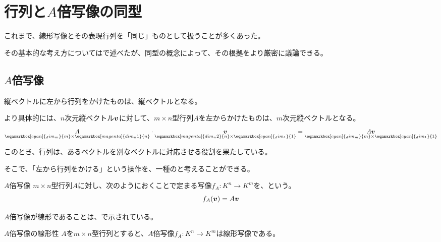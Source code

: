 \documentclass[../../../topic_linear-algebra]{subfiles}
\begin{document}
\sectionline
\section{行列と$A$倍写像の同型}\label{sec:matrix-A-map-isomorphism}

これまで、線形写像とその表現行列を「同じ」ものとして扱うことが多くあった。

その基本的な考え方についてはで述べたが、同型の概念によって、その根拠をより厳密に議論できる。

\subsection{$A$倍写像}

縦ベクトルに左から行列をかけたものは、縦ベクトルとなる。

より具体的には、$n$次元縦ベクトル$\vb*{v}$に対して、$m \times n$型行列$A$を左からかけたものは、$m$次元縦ベクトルとなる。
\begin{equation*}
  \underset{\eqnmarkbox[cyan]{_dim_m}{m} \times \eqnmarkbox[magenta]{dim_n1}{n}}{A} \cdot \underset{\eqnmarkbox[magenta]{dim_n2}{n} \times \eqnmarkbox[cyan]{_dim_1}{1}}{\vb*{v}} = \underset{\eqnmarkbox[cyan]{_dim_m}{m} \times \eqnmarkbox[cyan]{_dim_1}{1}}{A \vb*{v}}
\end{equation*}

このとき、行列は、あるベクトルを別なベクトルに対応させる役割を果たしている。

そこで、「左から行列をかける」という操作を、一種のと考えることができる。

\begin{definition*}{$A$倍写像}
  $m \times n$型行列$A$に対し、次のようにおくことで定まる写像$f_A \colon K^n \to K^m$を、という。
  \begin{equation*}
    f_A (\vb*{v}) = A \vb*{v}
  \end{equation*}
\end{definition*}

\br

$A$倍写像が線形であることは、で示されている。

\begin{theorem*}{$A$倍写像の線形性}
  $A$を$m \times n$型行列とすると、$A$倍写像$f_A\colon K^n \to K^m$は線形写像である。
\end{theorem*}
\end{document}
